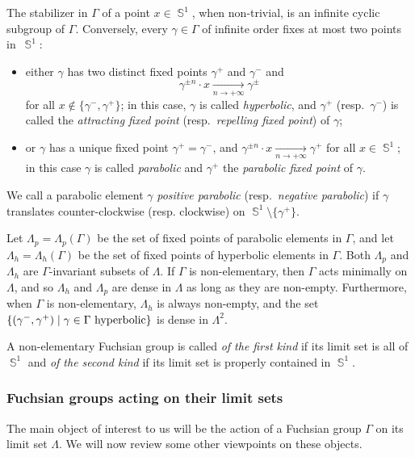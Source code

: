\documentclass{amsart}
\theoremstyle{plain}
\theoremstyle{definition}
\DeclareMathOperator{\Sb}{\mathbb{S}}
\newcommand{\1}{\mathbf{1}}
\begin{document}
The stabilizer in $\Gamma$ of a point $x\in \Sb^1$, when non-trivial, is an infinite cyclic subgroup of $\Gamma$. Conversely, every $\gamma \in \Gamma$ of infinite order fixes at most two points in~$\Sb^1$:
\begin{itemize}
    \item either $\gamma$ has two distinct fixed points $\gamma^+$ and $\gamma^-$ and 
    \[\gamma^{\pm n} \cdot x \underset{n\to +\infty}{\longrightarrow} \gamma^\pm\]
    for all $x\notin \{\gamma^-,\gamma^+\}$; in this case, $\gamma$ is called \emph{hyperbolic}, and $\gamma^+$ (resp.\ $\gamma^-$) is called the \emph{attracting fixed point} (resp.\  \emph{repelling fixed point}) of $\gamma$;
    \item or $\gamma$ has a unique fixed point $\gamma^+= \gamma^-$, and $\gamma^{\pm n}\cdot x \underset{n\to +\infty}{\longrightarrow} \gamma^+$ for all $x\in \Sb^1$; in this case $\gamma$ is called \emph{parabolic} and $\gamma^+$ the \emph{parabolic fixed point} of $\gamma$.
\end{itemize}

We call a parabolic element $\gamma$ \emph{positive parabolic} (resp.\ \emph{negative parabolic}) if $\gamma$ translates counter-clockwise (resp. clockwise) on $\Sb^1 \setminus \{\gamma^+\}$.

Let $\Lambda_p=\Lambda_p(\Gamma)$ be the set of fixed points of parabolic elements in $\Gamma$, and let $\Lambda_h=\Lambda_h(\Gamma)$ be the set of fixed points of hyperbolic elements in $\Gamma$. Both $\Lambda_p$ and $\Lambda_h$ are $\Gamma$-invariant subsets of $\Lambda$. If $\Gamma$ is non-elementary, then $\Gamma$ acts minimally on $\Lambda$, and so $\Lambda_h$ and $\Lambda_p$ are dense in $\Lambda$ as long as they are non-empty. Furthermore, when $\Gamma$ is non-elementary, $\Lambda_h$ is always non-empty, and the set $\{(\gamma^-, \gamma^+)\mid \gamma \in \Gamma \textnormal { hyperbolic}\}$ is dense in $\Lambda^2$.

A non-elementary Fuchsian group is called \emph{of the first kind} if its limit set is all of $\Sb^1$ and \emph{of the second kind} if its limit set is properly contained in $\Sb^1$.

\subsubsection{Fuchsian groups acting on their limit sets}
The main object of interest to us will be the action of a Fuchsian group $\Gamma$ on its limit set $\Lambda$. 
We will now review some other viewpoints on these objects. 
\end{document}
